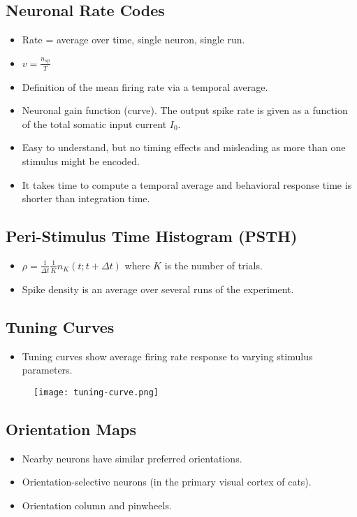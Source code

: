 \documentclass[main]{subfiles}
\begin{document}
\subsection{Neuronal Rate Codes}
\begin{itemize}[noitemsep,nolistsep]
	\item Rate = average over time, single neuron, single run.
	\item $v = \frac{n_{sp}}{T}$
	\item Definition of the mean firing rate via a temporal average.
	\item Neuronal gain function (curve). The output spike rate is given as a function of the total somatic input current $I_0$.
	\item Easy to understand, but no timing effects and misleading as more than one stimulus might be encoded.
	\item It takes time to compute a temporal average and behavioral response time is shorter than integration time.
\end{itemize}

\subsection{Peri-Stimulus Time Histogram (PSTH)}
\begin{itemize}[noitemsep,nolistsep]
	\item $\rho = \frac{1}{\Delta t}\frac{1}{K}n_K(t;t+\Delta t)$ where $K$ is the number of trials.
	\item Spike density is an average over several runs of the experiment.
\end{itemize}

\subsection{Tuning Curves}
\begin{itemize}[noitemsep,nolistsep]
	\item Tuning curves show average firing rate response to varying stimulus parameters.
\end{itemize}
\begin{figure}[H]
	\centering
	\texttt{[image: tuning-curve.png]}
\end{figure}

\subsection{Orientation Maps}
\begin{itemize}[noitemsep,nolistsep]
	\item Nearby neurons have similar preferred orientations.
	\item Orientation-selective neurons (in the primary visual cortex of cats).
	\item Orientation column and pinwheels.
\end{itemize}
\end{document}
